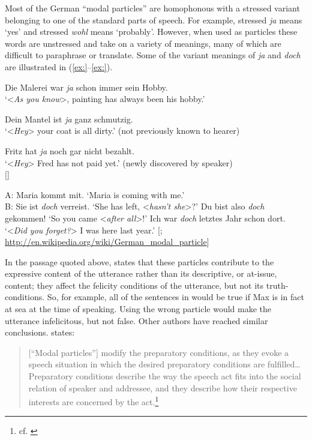 Most of the German “modal particles” are homophonous with a stressed variant belonging to one of the standard parts of speech. For example, stressed \textit{ja} means ‘yes’ and stressed \textit{wohl} means ‘probably’. However, when used as particles these words are unstressed and take on a variety of meanings, many of which are difficult to paraphrase or translate. Some of the variant meanings of \textit{ja} and \textit{doch} are illustrated in (\ref{ex:}--\ref{ex:}).


\ea
\ea  Die Malerei war \textit{ja} schon immer sein Hobby.\\
\glt ‘<\textit{As you know}>, painting has always been his hobby.’

\ex  Dein Mantel ist \textit{ja} ganz schmutzig.\\
\glt ‘<\textit{Hey}> your coat is all dirty.’ (not previously known to hearer)

\ex Fritz hat \textit{ja} noch gar nicht bezahlt.\\
\glt ‘<\textit{Hey}> Fred has not paid yet.’ (newly discovered by speaker)\\
{}[\citealt{König1991,KönigEtAl1990,Waltereit2001}]
\z \z

\ea \ea   A: Maria kommt mit. ‘Maria is coming with me.’\\
    B: Sie ist \textit{doch} verreist. ‘She has left, <\textit{hasn’t she}>?’
\ex  Du bist also \textit{doch} gekommen! ‘So you came <\textit{after all}>!’
\ex Ich war \textit{doch} letztes Jahr schon dort. ‘<\textit{Did you forget?}> I was here last year.’  [\citet{Karagjosova2000}; \url{http://en.wikipedia.org/wiki/German\_modal\_particle}]
\z \z 


In the passage quoted above, \citet{Zimmermann2011} states that these particles contribute to the expressive content of the utterance rather than its descriptive, or at-issue, content; they affect the felicity conditions of the utterance, but not its truth-conditions. So, for example, all of the sentences in  would be true if Max is in fact at sea at the time of speaking. Using the wrong particle would make the utterance infelicitous, but not false. Other authors have reached similar conclusions. \citet{Waltereit2001} states:


\begin{quote}
{}[“Modal particles”] modify the preparatory conditions, as they evoke a speech situation in which the desired preparatory conditions are fulfilled… Preparatory conditions describe the way the speech act fits into the social relation of speaker and addressee, and they describe how their respective interests are concerned by the act.\footnote{cf. \citet{Searle1969}}
\end{quote}


